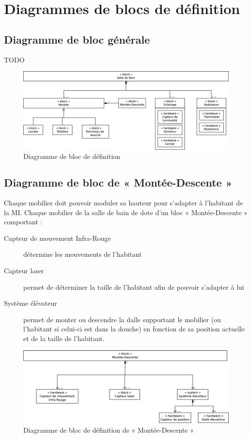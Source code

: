 \chapter{Diagrammes de blocs de définition}
\section{Diagramme de bloc générale}
TODO 
\begin{figure}[H]
	\centering
	\includegraphics[width=1\linewidth]{diagrams/bathroom/diagramme_blocks_bdd.eps}
	\caption{Diagramme de bloc de définition}
	\label{fig:diagramme_bdd}
\end{figure}

\section{Diagramme de bloc de « Montée-Descente »}
Chaque mobilier doit pouvoir moduler sa hauteur pour s'adapter à l'habitant de la MI. Chaque mobilier de la salle de bain de dote d'un bloc « Montée-Descente » comportant :
\begin{description}
	\item[Capteur de mouvement Infra-Rouge] détermine les mouvements de l'habitant
	\item[Capteur laser] permet de déterminer la taille de l'habitant afin de pouvoir s'adapter à lui
	\item[Système élévateur] permet de monter ou descendre la dalle supportant le mobilier (ou l'habitant si celui-ci est dans la douche) en fonction de sa position actuelle et de la taille de l'habitant.   
\end{description}

\begin{figure}[H]
	\centering
	\includegraphics[width=1\linewidth]{diagrams/bathroom/diagramme_blocks_bdd2.eps}
	\caption{Diagramme de bloc de définition de « Montée-Descente »}
	\label{fig:diagramme_bdd2}
\end{figure}
